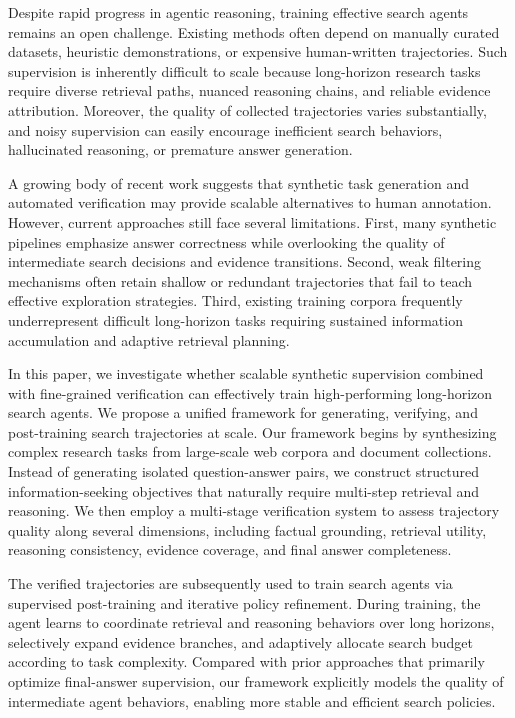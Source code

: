 \documentclass{article}
\begin{document}
Despite rapid progress in agentic reasoning, training effective search agents remains an open challenge. Existing methods often depend on manually curated datasets, heuristic demonstrations, or expensive human-written trajectories. Such supervision is inherently difficult to scale because long-horizon research tasks require diverse retrieval paths, nuanced reasoning chains, and reliable evidence attribution. Moreover, the quality of collected trajectories varies substantially, and noisy supervision can easily encourage inefficient search behaviors, hallucinated reasoning, or premature answer generation.

A growing body of recent work suggests that synthetic task generation and automated verification may provide scalable alternatives to human annotation. However, current approaches still face several limitations. First, many synthetic pipelines emphasize answer correctness while overlooking the quality of intermediate search decisions and evidence transitions. Second, weak filtering mechanisms often retain shallow or redundant trajectories that fail to teach effective exploration strategies. Third, existing training corpora frequently underrepresent difficult long-horizon tasks requiring sustained information accumulation and adaptive retrieval planning.

In this paper, we investigate whether scalable synthetic supervision combined with fine-grained verification can effectively train high-performing long-horizon search agents. We propose a unified framework for generating, verifying, and post-training search trajectories at scale. Our framework begins by synthesizing complex research tasks from large-scale web corpora and document collections. Instead of generating isolated question-answer pairs, we construct structured information-seeking objectives that naturally require multi-step retrieval and reasoning. We then employ a multi-stage verification system to assess trajectory quality along several dimensions, including factual grounding, retrieval utility, reasoning consistency, evidence coverage, and final answer completeness.

The verified trajectories are subsequently used to train search agents via supervised post-training and iterative policy refinement. During training, the agent learns to coordinate retrieval and reasoning behaviors over long horizons, selectively expand evidence branches, and adaptively allocate search budget according to task complexity. Compared with prior approaches that primarily optimize final-answer supervision, our framework explicitly models the quality of intermediate agent behaviors, enabling more stable and efficient search policies.
\end{document}

